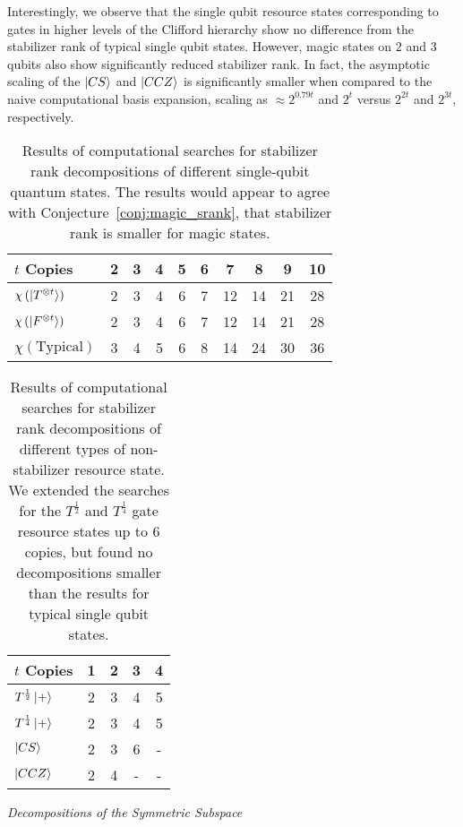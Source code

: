 Interestingly, we observe that the single qubit resource states corresponding to gates in higher levels of the Clifford hierarchy show no difference from the stabilizer rank of typical single qubit states. However, magic states on $2$ and $3$ qubits also show significantly reduced stabilizer rank. In fact, the asymptotic scaling of the $\ket{CS}$ and $\ket{CCZ}$ is significantly smaller when compared to the naive computational basis expansion, scaling as $\approx 2^{0.79  t}$ and $2^{t}$ versus $2^{2t}$ and $2^{3t}$, respectively.
\begin{table}[H]
\centering
\begin{tabular}{|l|c|c|c|c|c|c|c|c|c|}
\hline
$t$ Copies & 2 & 3 & 4 & 5 & 6 & 7 & 8 & 9 & 10\\ \hline
$\chi\left(\ket{T^{\otimes t}}\right)$ & 2 & 3 & 4 & 6 & 7 & 12 & 14 & 21 & 28 \\ 
$\chi\left(\ket{F^{\otimes t}}\right)$ & 2 & 3 & 4 & 6 & 7 & 12 & 14 & 21 & 28 \\ 
$\chi\left(\text{Typical}\right)$ & 3 & 4 & 5 & 6 & 8 & 14 & 24 & 30 & 36 \\ \hline
\end{tabular}
\caption{Results of computational searches for stabilizer rank decompositions of different single-qubit quantum states. The results would appear to agree with Conjecture~\ref{conj:magic_srank}, that stabilizer rank is smaller for magic states.}
\label{tab:exact_rank_results}
\end{table}
\begin{table}[H]
\centering
\begin{tabular}{|l|c|c|c|c|}
\hline
$t$ Copies & 1 & 2 & 3 & 4 \\ \hline
$T^{\frac{1}{2}}\ket{+}$ & 2 & 3 & 4 & 5 \\
$T^{\frac{1}{4}}\ket{+}$ & 2 & 3 & 4 & 5 \\
$\ket{CS}$ & 2 & 3 & 6 & - \\
$\ket{CCZ}$ & 2 & 4 & - & - \\ \hline
\end{tabular}
\caption{Results of computational searches for stabilizer rank decompositions of different types of non-stabilizer resource state. We extended the searches for the $T^{\frac{1}{2}}$ and $T^{\frac{1}{4}}$ gate resource states up to $6$ copies, but found no decompositions smaller than the results for typical single qubit states.}
\label{tab:resource_state_rank}
\end{table}
\par
\large{\itshape{Decompositions of the Symmetric Subspace}}\par
